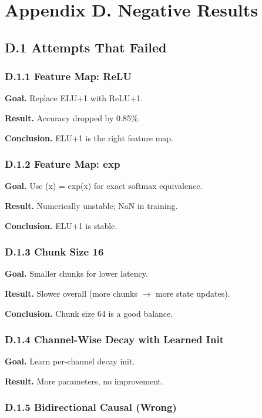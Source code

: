 
\section{Appendix D. Negative Results}

\subsection{D.1 Attempts That Failed}

\subsubsection{D.1.1 Feature Map: ReLU}

\textbf{Goal.} Replace ELU+1 with ReLU+1.

\textbf{Result.} Accuracy dropped by 0.85\%.

\textbf{Conclusion.} ELU+1 is the right feature map.

\subsubsection{D.1.2 Feature Map: exp}

\textbf{Goal.} Use  (x) = exp(x) for exact softmax equivalence.

\textbf{Result.} Numerically unstable; NaN in training.

\textbf{Conclusion.} ELU+1 is stable.

\subsubsection{D.1.3 Chunk Size 16}

\textbf{Goal.} Smaller chunks for lower latency.

\textbf{Result.} Slower overall (more chunks $\to$ more state updates).

\textbf{Conclusion.} Chunk size 64 is a good balance.

\subsubsection{D.1.4 Channel-Wise Decay with Learned Init}

\textbf{Goal.} Learn per-channel decay init.

\textbf{Result.} More parameters, no improvement.

\subsubsection{D.1.5 Bidirectional Causal (Wrong)}

